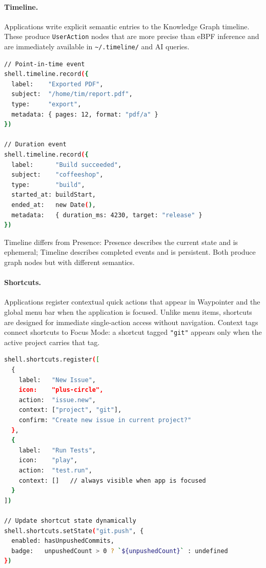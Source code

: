 \paragraph{Timeline.}
Applications write explicit semantic entries to the Knowledge Graph timeline.
These produce \texttt{UserAction} nodes that are more precise than eBPF
inference and are immediately available in \texttt{\textasciitilde/.timeline/}
and AI queries.

\begin{lstlisting}[language=bash, caption={shell.timeline}]
// Point-in-time event
shell.timeline.record({
  label:    "Exported PDF",
  subject:  "/home/tim/report.pdf",
  type:     "export",
  metadata: { pages: 12, format: "pdf/a" }
})

// Duration event
shell.timeline.record({
  label:      "Build succeeded",
  subject:    "coffeeshop",
  type:       "build",
  started_at: buildStart,
  ended_at:   new Date(),
  metadata:   { duration_ms: 4230, target: "release" }
})
\end{lstlisting}

Timeline differs from Presence: Presence describes the current state and is
ephemeral; Timeline describes completed events and is persistent. Both produce
graph nodes but with different semantics.

\paragraph{Shortcuts.}
Applications register contextual quick actions that appear in Waypointer and
the global menu bar when the application is focused. Unlike menu items,
shortcuts are designed for immediate single-action access without navigation.
Context tags connect shortcuts to Focus Mode: a shortcut tagged \texttt{"git"}
appears only when the active project carries that tag.

\begin{lstlisting}[language=bash, caption={shell.shortcuts}]
shell.shortcuts.register([
  {
    label:   "New Issue",
    icon:    "plus-circle",
    action:  "issue.new",
    context: ["project", "git"],
    confirm: "Create new issue in current project?"
  },
  {
    label:   "Run Tests",
    icon:    "play",
    action:  "test.run",
    context: []   // always visible when app is focused
  }
])

// Update shortcut state dynamically
shell.shortcuts.setState("git.push", {
  enabled: hasUnpushedCommits,
  badge:   unpushedCount > 0 ? `${unpushedCount}` : undefined
})
\end{lstlisting}

